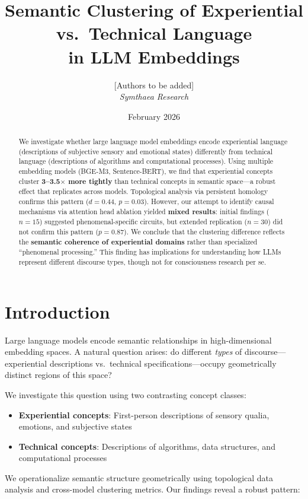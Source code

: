 \documentclass[11pt,a4paper]{article}
\title{Semantic Clustering of Experiential vs.\ Technical Language\\in LLM Embeddings}
\author{
  [Authors to be added]\\
  \textit{Symthaea Research}
}
\date{February 2026}
\newcommand{\pval}{\textit{p}}
\newcommand{\dval}{\textit{d}}
\begin{document}
\maketitle

\begin{abstract}
We investigate whether large language model embeddings encode experiential language (descriptions of subjective sensory and emotional states) differently from technical language (descriptions of algorithms and computational processes). Using multiple embedding models (BGE-M3, Sentence-BERT), we find that experiential concepts cluster \textbf{3--3.5$\times$ more tightly} than technical concepts in semantic space---a robust effect that replicates across models. Topological analysis via persistent homology confirms this pattern ($\dval=0.44$, $\pval=0.03$). However, our attempt to identify causal mechanisms via attention head ablation yielded \textbf{mixed results}: initial findings ($n=15$) suggested phenomenal-specific circuits, but extended replication ($n=30$) did not confirm this pattern ($\pval=0.87$). We conclude that the clustering difference reflects the \textbf{semantic coherence of experiential domains} rather than specialized ``phenomenal processing.'' This finding has implications for understanding how LLMs represent different discourse types, though not for consciousness research per se.
\end{abstract}

\section{Introduction}

Large language models encode semantic relationships in high-dimensional embedding spaces. A natural question arises: do different \textit{types} of discourse---experiential descriptions vs.\ technical specifications---occupy geometrically distinct regions of this space?

We investigate this question using two contrasting concept classes:
\begin{itemize}
    \item \textbf{Experiential concepts}: First-person descriptions of sensory qualia, emotions, and subjective states
    \item \textbf{Technical concepts}: Descriptions of algorithms, data structures, and computational processes
\end{itemize}

We operationalize semantic structure geometrically using topological data analysis and cross-model clustering metrics. Our findings reveal a robust pattern:
\end{document}
